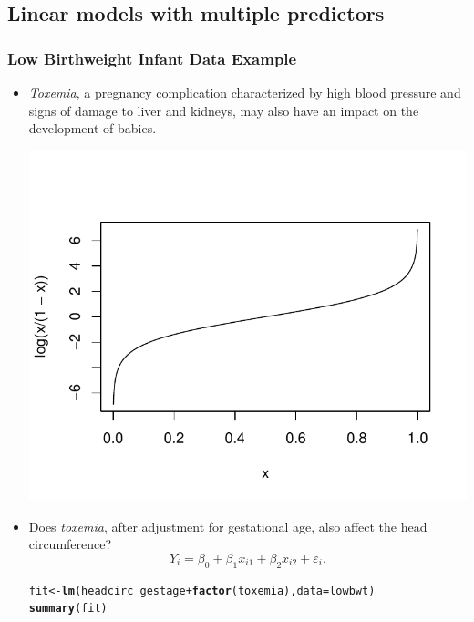 \documentclass{article}\usepackage[]{graphicx}\usepackage[svgnames]{xcolor}
\makeatletter
\def\maxwidth{ %
  \ifdim\Gin@nat@width>\linewidth
    \linewidth
  \else
    \Gin@nat@width
  \fi
}
\newcommand{\hlopt}[1]{\textcolor[rgb]{0,0,0}{#1}}%
\newcommand{\hlstd}[1]{\textcolor[rgb]{0.345,0.345,0.345}{#1}}%
\newcommand{\hlkwb}[1]{\textcolor[rgb]{0.69,0.353,0.396}{#1}}%
\newcommand{\hlkwc}[1]{\textcolor[rgb]{0.333,0.667,0.333}{#1}}%
\newcommand{\hlkwd}[1]{\textcolor[rgb]{0.737,0.353,0.396}{\textbf{#1}}}%
\newenvironment{kframe}{%
 \def\at@end@of@kframe{}%
 \ifinner\ifhmode%
  \def\at@end@of@kframe{\end{minipage}}%
  \begin{minipage}{\columnwidth}%
 \fi\fi%
 \def\FrameCommand##1{\hskip\@totalleftmargin \hskip-\fboxsep
 \colorbox{shadecolor}{##1}\hskip-\fboxsep
     \hskip-\linewidth \hskip-\@totalleftmargin \hskip\columnwidth}%
 \MakeFramed {\advance\hsize-\width
   \@totalleftmargin\z@ \linewidth\hsize
   \@setminipage}}%
 {\par\unskip\endMakeFramed%
 \at@end@of@kframe}
\newenvironment{knitrout}{}{} %
\makeatother
\begin{document}
\subsection*{Linear models with multiple predictors}
\subsubsection*{Low Birthweight Infant Data Example}
\begin{itemize}
      \item \emph{Toxemia}, a pregnancy complication characterized by high blood pressure
            and signs of damage to liver and kidneys, may also have an impact on the
            development of babies.
\begin{knitrout}
\color{fgcolor}

{\centering \includegraphics[width=\maxwidth]{figure/unnamed-chunk-18-1} 

}


\end{knitrout}
      \item Does \emph{toxemia}, after adjustment for gestational age, also affect the head
            circumference?
            \[ Y_i=\beta_0+\beta_1x_{i1}+\beta_2x_{i2}+\varepsilon_i. \]
\begin{knitrout}
\color{fgcolor}\begin{kframe}
\begin{alltt}
\hlstd{fit} \hlkwb{<-} \hlkwd{lm}\hlstd{(headcirc} \hlopt{~} \hlstd{gestage} \hlopt{+} \hlkwd{factor}\hlstd{(toxemia),} \hlkwc{data} \hlstd{= lowbwt)}
\hlkwd{summary}\hlstd{(fit)}
\end{alltt}
\begin{verbatim}


\end{verbatim}
\end{kframe}
\end{knitrout}
\end{itemize}
\end{document}
